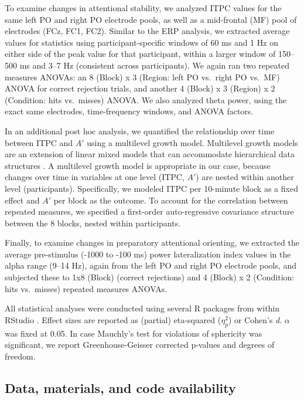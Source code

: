 \documentclass[11pt,]{memoir}
\begin{document}
To examine changes in attentional stability, we analyzed ITPC values for the same left PO and right PO electrode pools, as well as a mid-frontal (MF) pool of electrodes (FCz, FC1, FC2). Similar to the ERP analysis, we extracted average values for statistics using participant-specific windows of 60 ms and 1 Hz on either side of the peak value for that participant, within a larger window of 150--500 ms and 3--7 Hz (consistent across participants). We again ran two repeated measures ANOVAs: an 8 (Block) x 3 (Region: left PO vs.~right PO vs.~MF) ANOVA for correct rejection trials, and another 4 (Block) x 3 (Region) x 2 (Condition: hits vs.~misses) ANOVA. We also analyzed theta power, using the exact same electrodes, time-frequency windows, and ANOVA factors.

In an additional post hoc analysis, we quantified the relationship over time between ITPC and \(A'\) using a multilevel growth model. Multilevel growth models are an extension of linear mixed models that can accommodate hierarchical data structures \autocite[see e.g.][]{Kristjansson2007}. A multilevel growth model is appropriate in our case, because changes over time in variables at one level (ITPC, \(A'\)) are nested within another level (participants). Specifically, we modeled ITPC per 10-minute block as a fixed effect and \(A'\) per block as the outcome. To account for the correlation between repeated measures, we specified a first-order auto-regressive covariance structure between the 8 blocks, nested within participants.

Finally, to examine changes in preparatory attentional orienting, we extracted the average pre-stimulus (-1000 to -100 ms) power lateralization index values in the alpha range (9--14 Hz), again from the left PO and right PO electrode pools, and subjected these to 1x8 (Block) (correct rejections) and 4 (Block) x 2 (Condition: hits vs.~misses) repeated measures ANOVAs.

All statistical analyses were conducted using several R \autocite{R2017} packages \autocites{R-ez}{R-BayesFactor}{R-nlme}{R-broom}{R-tidyverse} from within RStudio \autocite{RStudio2016}. Effect sizes are reported as (partial) eta-squared (\(\eta^{2}_{p}\)) or Cohen's \emph{d}. \(\alpha\) was fixed at 0.05. In case Mauchly's test for violations of sphericity was significant, we report Greenhouse-Geisser corrected p-values and degrees of freedom.

\hypertarget{data-materials-and-code-availability-3}{%
\subsection{Data, materials, and code availability}\label{data-materials-and-code-availability-3}}
\end{document}
